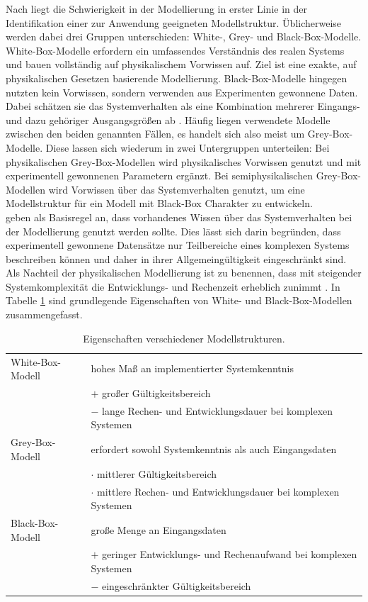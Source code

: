 Nach \citet{sjoberg_nonlinear_1995} liegt die Schwierigkeit in der Modellierung in erster Linie in der Identifikation einer zur Anwendung geeigneten Modellstruktur. Üblicherweise werden dabei drei Gruppen unterschieden: White-, Grey- und Black-Box-Modelle. White-Box-Modelle erfordern ein umfassendes Verständnis des realen Systems und bauen vollständig auf physikalischem Vorwissen auf. Ziel ist eine exakte, auf physikalischen Gesetzen basierende Modellierung. Black-Box-Modelle hingegen nutzten kein Vorwissen, sondern verwenden aus Experimenten gewonnene Daten. Dabei schätzen sie das Systemverhalten als eine Kombination mehrerer Eingangs- und dazu gehöriger Ausgangsgrößen ab \citep{hauth_grey-box_2008}. Häufig liegen verwendete Modelle zwischen den beiden genannten Fällen, es handelt sich also meist um Grey-Box-Modelle. Diese lassen sich wiederum in zwei Untergruppen unterteilen: Bei physikalischen Grey-Box-Modellen wird physikalisches Vorwissen genutzt und mit experimentell gewonnenen Parametern ergänzt. Bei semiphysikalischen Grey-Box-Modellen wird Vorwissen über das Systemverhalten genutzt, um eine Modellstruktur für ein Modell mit Black-Box Charakter zu entwickeln.\\
\citet{sjoberg_nonlinear_1995} geben als Basisregel an, dass vorhandenes Wissen über das Systemverhalten bei der Modellierung genutzt werden sollte. Dies lässt sich darin begründen, dass experimentell gewonnene Datensätze nur Teilbereiche eines komplexen Systems beschreiben können und daher in ihrer Allgemeingültigkeit eingeschränkt sind. Als Nachteil der physikalischen Modellierung ist zu benennen, dass mit steigender Systemkomplexität die Entwicklungs- und Rechenzeit erheblich zunimmt \citep{hauth_grey-box_2008}. In Tabelle \ref{tb:Modellstrukturen} sind grundlegende Eigenschaften von White- und Black-Box-Modellen zusammengefasst.

\begin{table}[ht]
		\centering
		\caption{Eigenschaften verschiedener Modellstrukturen.}
		
\begin{tabular}{l l}
		\toprule
		White-Box-Modell & hohes Maß an implementierter Systemkenntnis\\
		& $+$ großer Gültigkeitsbereich\\
		& $-$ lange Rechen- und Entwicklungsdauer bei komplexen Systemen\\
		\midrule
		Grey-Box-Modell & erfordert sowohl Systemkenntnis als auch Eingangsdaten\\
		& $\cdot$ mittlerer Gültigkeitsbereich\\
		& $\cdot$ mittlere Rechen- und Entwicklungsdauer bei komplexen Systemen\\
		\midrule
		Black-Box-Modell & große Menge an Eingangsdaten\\
		& $+$ geringer Entwicklungs- und Rechenaufwand bei komplexen Systemen\\
		& $-$ eingeschränkter Gültigkeitsbereich\\
		\bottomrule
		\end{tabular}
		\label{tb:Modellstrukturen}
		\end{table}	

